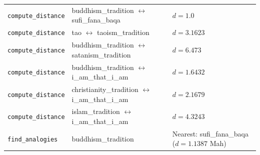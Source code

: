 \documentclass[12pt,a4paper]{article}
\begin{document}
\begin{table}[htbp]
\begin{tabularx}{\textwidth}{>{\centering\arraybackslash}X >{\centering\arraybackslash}X >{\centering\arraybackslash}X}
\texttt{compute\_distance} & buddhism\_tradition $\leftrightarrow$ sufi\_fana\_baqa & $d = 1.0$ \\
\texttt{compute\_distance} & tao $\leftrightarrow$ taoism\_tradition & $d = 3.1623$ \\
\texttt{compute\_distance} & buddhism\_tradition $\leftrightarrow$ satanism\_tradition & $d = 6.473$ \\
\texttt{compute\_distance} & buddhism\_tradition $\leftrightarrow$ i\_am\_that\_i\_am & $d = 1.6432$ \\
\texttt{compute\_distance} & christianity\_tradition $\leftrightarrow$ i\_am\_that\_i\_am & $d = 2.1679$ \\
\texttt{compute\_distance} & islam\_tradition $\leftrightarrow$ i\_am\_that\_i\_am & $d = 4.3243$ \\
\texttt{find\_analogies} & buddhism\_tradition & Nearest: sufi\_fana\_baqa ($d = 1.1387$ Mah) \\
\bottomrule
\end{tabularx}
\end{table}
\end{document}
